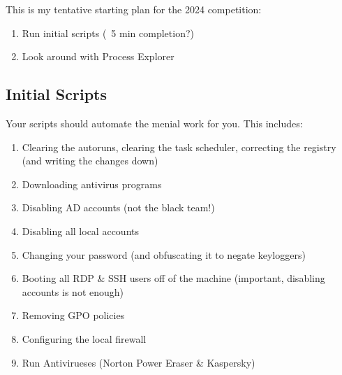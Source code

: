 \documentclass{article}
\begin{document}
This is my tentative starting plan for the 2024 competition:
\begin{enumerate}
        \item Run initial scripts (~5 min completion?)
        \item Look around with Process Explorer
\end{enumerate}

\subsection{Initial Scripts}
Your scripts should automate the menial work for you. This includes:
\begin{enumerate}
        \item Clearing the autoruns, clearing the task scheduler, correcting the registry (and writing the changes down)
        \item Downloading antivirus programs
        \item Disabling AD accounts (not the black team!)
        \item Disabling all local accounts
        \item Changing your password (and obfuscating it to negate keyloggers)
        \item Booting all RDP \& SSH users off of the machine (important, disabling accounts is not enough)
        \item Removing GPO policies
        \item Configuring the local firewall
        \item Run Antivirueses (Norton Power Eraser \& Kaspersky)
\end{enumerate}
\end{document}
